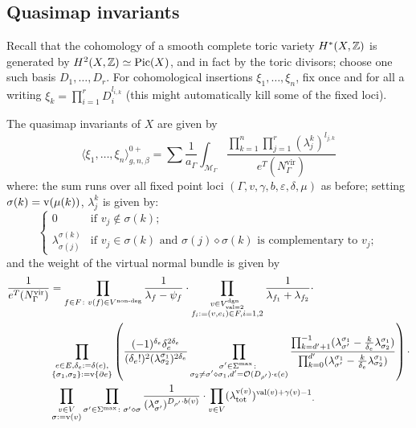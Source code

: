 \subsection{Quasimap invariants} Recall that the cohomology of a smooth complete toric variety $H^*(X,\mathbb{Z})$ is generated by $H^2(X,\mathbb{Z})\simeq\operatorname{Pic}(X)$, and in fact by the toric divisors; choose one such basis $D_1,\ldots,D_r$. For cohomological insertions $\xi_1,\ldots,\xi_n$, fix once and for all a writing $\xi_k=\prod_{i=1}^r D_i^{l_{i,k}}$ (this might automatically kill some of the fixed loci).

\begin{prop}

The quasimap invariants of $X$ are given by
\begin{equation*}
 \langle \xi_1,\ldots,\xi_n\rangle^{0+}_{g,n,\beta}=\sum \frac{1}{a_\Gamma}\int_{\mathcal M_\Gamma}\frac{\prod_{k=1}^n\prod_{j=1}^r(\lambda^k_j)^{l_{j,k}}}{e^T(N_\Gamma^\text{vir})}
\end{equation*}
where: the sum runs over all fixed point loci $\left(\Gamma, v, \gamma, b,\varepsilon,\delta,\mu\right)$ as before; setting $\sigma(k)=\operatorname{v}(\mu(k))$, $\lambda^k_j$ is given by:
\begin{equation*}
 \begin{cases}
  0 & \text{if } v_j\notin \sigma(k); \\
  \lambda^{\sigma(k)}_{\sigma(j)} & \text{if } v_j\in\sigma(k) \text{ and } \sigma(j)\diamond\sigma(k) \text{ is complementary to } v_j;
 \end{cases}
\end{equation*}
and the weight of the virtual normal bundle is given by
\begin{equation*}
 \begin{aligned}
  \frac{1}{e^T(N_\Gamma^{\text{vir}})}&=\prod_{f\in F\colon v(f)\in V^{\text{non-deg}}} \frac{1}{\lambda_f-\psi_f} \cdot \prod_{\substack{v\in V^\text{dgn}_{\operatorname{val}=2}\\ f_i:=(v,e_i)\in F, i=1,2}} \frac{1}{\lambda_{f_1}+\lambda_{f_2}} \cdot \\  
  &\prod_{\substack{e\in E, \delta_e:=\delta(e), \\ \{\sigma_1,\sigma_2\}:=\operatorname{v}\{\partial e\}}}\left( \frac{(-1)^{\delta_e}\delta_e^{2\delta_e}}{(\delta_e!)^2(\lambda^{\sigma_1}_{\sigma_2})^{2\delta_e}}\prod_{\substack{\sigma'\in\Sigma^{\text{max}}\colon \\ \sigma_2\neq\sigma'\diamond\sigma_1,d'=\mathcal{O}(D_{\rho'})\cdot \epsilon(e)}}\frac{\prod_{k=d'+1}^{-1}(\lambda^{\sigma_1}_{\sigma'}-\frac{k}{\delta_e}\lambda^{\sigma_1}_{\sigma_2})}{\prod_{k=0}^{d'}(\lambda^{\sigma_1}_{\sigma'}-\frac{k}{\delta_e}\lambda^{\sigma_1}_{\sigma_2})} \right) \cdot \\
  & \prod_{\substack{v\in V \\ \sigma:=\operatorname{v}(v)}} \prod_{\sigma'\in\Sigma^{\text{max}}\colon\sigma'\diamond\sigma}\frac{1}{(\lambda^{\sigma}_{\sigma'})^{D_{\rho'}\cdot b(v)}}\cdot \prod_{v\in V}(\lambda^{\operatorname{v}(v)}_{\text{tot}})^{\operatorname{val}(v)+\gamma(v)-1}{}_.
 \end{aligned}
\end{equation*}
\end{prop}

